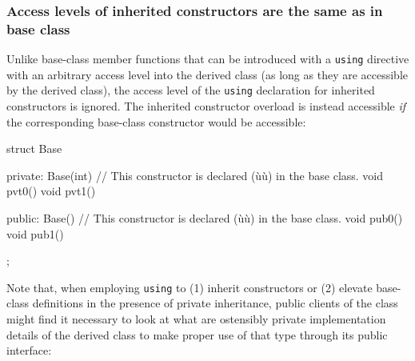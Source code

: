 \subsubsection[Access levels of inherited constructors are the same as in base class]{Access levels of inherited constructors are the same as in base class}\label{access-levels-of-inherited-constructors-are-same-as-in-base-class}

Unlike base-class member functions that can be introduced with a
\lstinline!using! directive with an arbitrary access level into the derived
class (as long as they are accessible by the derived class), the access
level of the \lstinline!using! declaration for inherited constructors is
ignored. The inherited constructor overload is instead
accessible \emph{if} the corresponding base-class constructor would be
accessible:

\begin{emcppslisting}[language=C++]
struct Base
{
private:
    Base(int) { }  // This constructor is declared (ù{}ù) in the base class.
    void pvt0() { }
    void pvt1() { }

public:
    Base() { }     // This constructor is declared (ù{}ù) in the base class.
    void pub0() { }
    void pub1() { }
};
\end{emcppslisting}
    
\noindent Note that, when employing \lstinline!using! to (1) inherit constructors or
(2) elevate base-class definitions in the presence of private
inheritance, public clients of the class might find it necessary 
to look at what are ostensibly private implementation details of the
derived class to make proper use of that type through its
public interface:

